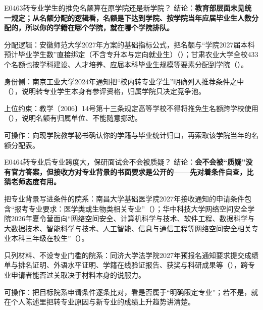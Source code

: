 \begin{qa}{E0463}{转专业学生的推免名额算在原学院还是新学院？}
结论：\textbf{教育部层面未见统一规定；从名额分配的逻辑看，名额是下达到学院、按学院当年应届毕业生人数分配的，所以你的学籍在哪个学院，就在哪个学院排队。}

分配逻辑：安徽师范大学2027年方案的基础指标公式，把名额与“学院2027届本科预计毕业学生数”直接绑定（不含专升本与定向就业生）（）；甘肃农业大学全校433个名额也按学科建设、人才培养、应届本科毕业生规模等要素分配到学院（）。

身份侧：南京工业大学2024年通知把“校内转专业学生”明确列入推荐条件之中（），说明转专业学生本身有参评资格，归属学院只决定竞争池。

上位约束：教学〔2006〕14号第十三条规定高等学校不得将推免生名额跨学校使用（），说明名额有归属单位、不能随意挪动。

可操作：向现学院教学秘书确认你的学籍与毕业统计归口，再索取该学院当年的名额分配表。
\end{qa}

\begin{qa}{E0464}{转专业后专业跨度大，保研面试会不会被质疑？}
结论：\textbf{会不会被“质疑”没有官方答案，但接收方对专业背景的书面要求是公开的——先对着条件自查，比猜老师态度有用。}

把专业背景写进条件的院系：南昌大学基础医学院2027年接收通知的申请条件包含“报考专业要求：医学类或生物类相关专业”（）；华中科技大学网络空间安全学院2026年夏令营面向“网络空间安全、计算机科学与技术、软件工程、数据科学与大数据技术、智能科学与技术、人工智能、信息与通信工程等网络空间安全相关专业本科三年级在校生”（）。

只列材料、不设专业门槛的院系：同济大学法学院2027年预报名通知要求提交成绩单与排名证明、外语水平证明、学籍在线验证报告、获奖与科研成果等（），跨专业申请者能否过关取决于材料本身的说服力。

可操作：把目标院系申请条件逐条比对，看是否属于“明确限定专业”；若不是，就在个人陈述里把转专业原因与新专业的成绩上升趋势讲清楚。
\end{qa}

